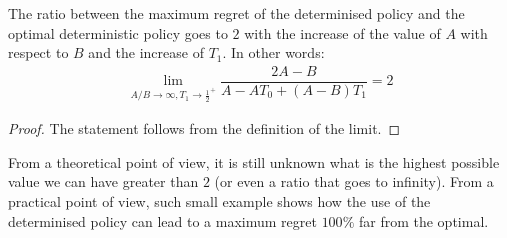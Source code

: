 \begin{lemma}\label{lemma:gap2}
The ratio between the maximum regret of the determinised policy and the optimal deterministic policy goes to $2$ with the increase of the value of $A$ with respect to $B$ and the increase of $T_1$. In other words:  
\begin{align*}
\lim_{A/B \rightarrow \infty, T_1 \rightarrow {\frac{1}{2}}^+} \dfrac{2A-B}{A- A T_0 +(A-B) T_1} = 2
\end{align*}
\end{lemma}
\begin{proof}
The statement follows from the definition of the limit.
\end{proof}


From a theoretical point of view, it is still unknown what is the highest possible value we can have greater than $2$ (or even a ratio that goes to infinity). From a practical point of view, such small example shows how the use of the determinised policy can lead to a maximum regret  $100\%$ far from the optimal. 